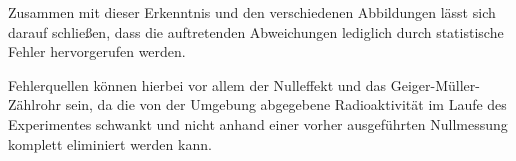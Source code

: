 Zusammen mit dieser Erkenntnis und den verschiedenen Abbildungen lässt sich darauf
schließen, dass die auftretenden Abweichungen lediglich durch statistische Fehler
hervorgerufen werden.

Fehlerquellen können hierbei vor allem der Nulleffekt und das Geiger-Müller-Zählrohr
sein, da die von der Umgebung abgegebene Radioaktivität im Laufe des Experimentes
schwankt und nicht anhand einer vorher ausgeführten Nullmessung komplett
eliminiert werden kann.
